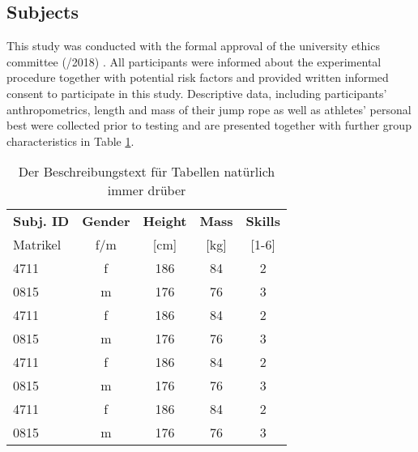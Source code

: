 \subsection{Subjects}
This study was conducted with the formal approval of the university ethics committee (/2018) . All participants were informed about the experimental procedure together with potential risk factors and provided written informed consent to participate in this study. Descriptive data, including participants' anthropometrics, length and mass of their jump rope as well as athletes' personal best were collected prior to testing and are presented together with further group characteristics in Table \ref{tab:anthropo}.


\begin{table}[h!]\centering
    \caption{Der Beschreibungstext f\"ur Tabellen nat\"urlich immer dr\"uber} \vspace{1ex}
    \begin{tabular}{lcccc}
    \toprule
    \textbf{Subj. ID} & \textbf{Gender} & \textbf{Height} & \textbf{Mass} & \textbf{Skills}\\
    Matrikel & f/m & [cm] & [kg] & [1-6]\\
    \midrule
    4711 & f& 186&84& 2\\
    0815 & m&176&76 & 3\\
    4711 & f& 186&84& 2\\
    0815 & m&176&76 & 3\\
    4711 & f& 186&84& 2\\
    0815 & m&176&76 & 3\\
    4711 & f& 186&84& 2\\
    0815 & m&176&76 & 3\\
    \bottomrule
    \end{tabular}
    \label{tab:anthropo}
\end{table}